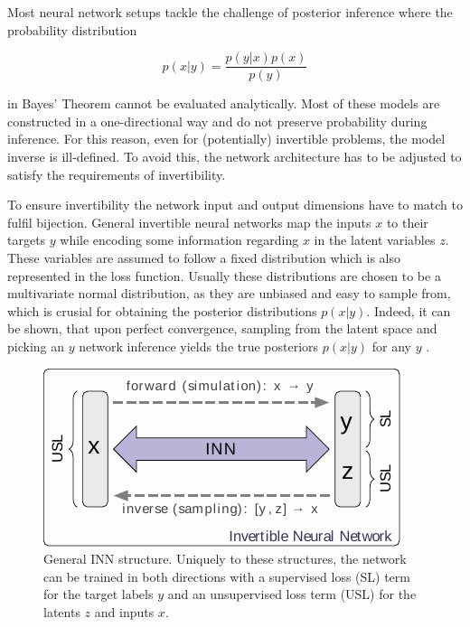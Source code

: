 
Most neural network setups tackle the challenge of posterior inference where the probability distribution 

\begin{equation*}
	p(x | y) = \frac{p(y | x) p(x)}{p(y)}
\end{equation*}

in Bayes' Theorem cannot be evaluated analytically. Most of these models are constructed in a one-directional way and do not preserve probability during inference. For this reason, even for (potentially) invertible problems, the model inverse is ill-defined. To avoid this, the network architecture has to be adjusted to satisfy the requirements of invertibility.


To ensure invertibility the network input and output dimensions have to match to fulfil bijection. General invertible neural networks map the inputs $x$ to their targets $y$ while encoding some information regarding $x$ in the latent variables $z$. These variables are assumed to follow a fixed distribution which is also represented in the loss function. Usually these distributions are chosen to be a multivariate normal distribution, as they are unbiased and easy to sample from, which is crusial for obtaining the posterior distributions $p(x | y)$. Indeed, it can be shown, that upon perfect convergence, sampling from the latent space and picking an $y$ network inference yields the true posteriors $p(x | y)$ for any $y$ \cite{INN_Ardizzone}.

\begin{figure}[h!]
	\centering
	\includegraphics[width=0.6\linewidth]{figures/neural_networks/inns.pdf}
	\caption{General INN structure. Uniquely to these structures, the network can be trained in both directions with a supervised loss (SL) term for the target labels $y$ and an unsupervised loss term (USL) for the latents $z$ and inputs $x$. \cite{INN_Ardizzone}}
	\label{fig:inn}
\end{figure}


